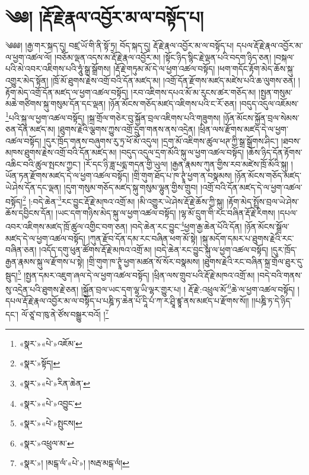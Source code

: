 \chapter{༄༅། །རྡོ་རྗེ་རྣལ་འབྱོར་མ་ལ་བསྟོད་པ།}༄༅༅། །རྒྱ་གར་སྐད་དུ། བཛྲ་ཡོ་གི་ནི་སྟོ་ཏྲ། བོད་སྐད་དུ། རྡོ་རྗེ་རྣལ་འབྱོར་མ་ལ་བསྟོད་པ། དཔལ་རྡོ་རྗེ་རྣལ་འབྱོར་མ་ལ་ཕྱག་འཚལ་ལོ། །བཅོམ་ལྡན་འདས་མ་རྡོ་རྗེ་རྣལ་འབྱོར་མ། །སྟོང་ཉིད་སྙིང་རྗེ་ལྡན་པའི་བདག་ཉིད་ཅན། །བསྐལ་པའི་མེ་འབར་འཇིགས་པའི་ཧཱུཾ་སྒྲ་སྒྲོགས། །རྡོ་རྗེ་གཏུམ་མོ་དེ་ལ་ཕྱག་འཚལ་བསྟོད། །ཕག་གདོང་རྟོག་མེད་ཆོས་སྐུ་འགྱུར་མེད་སྟོན། །ཁྲོ་མོ་ཐུགས་རྗེས་འགྲོ་བའི་དོན་མཛད་མ། །འགྲོ་དོན་རྫོགས་མཛད་མཛེས་པའི་ཆ་ལུགས་ཅན། །རྟོག་མེད་འགྲོ་དོན་མཛད་ལ་ཕྱག་འཚལ་བསྟོད། །རབ་འཇིགས་དཔའ་མོ་མ་རུངས་ཚར་གཅོད་མ། །སྤྱན་གསུམ་མཆེ་གཙིགས་སྐུ་གསུམ་དོན་དང་ལྡན། །ཉོན་མོངས་གཅོད་མཛད་འཇིགས་པའི་ང་རོ་ཅན། །བདུད་འདུལ་འཇོམས་\footnote{«སྣར་»«པེ་»འཇོམ་}པའི་སྐུ་ལ་ཕྱག་འཚལ་བསྟོད། །སྐྲ་གྲོལ་གཅེར་བུ་སྐྱོན་བྲལ་འཇིགས་པའི་གཟུགས། །ཉོན་མོངས་སྐྱོན་བྲལ་སེམས་ཅན་དོན་མཛད་མ། །ཐུགས་རྗེའི་ལྕགས་ཀྱུས་འགྲོ་དྲུག་གནས་ནས་འདྲེན། །ཕྲིན་ལས་རྫོགས་མཛད་དེ་ལ་ཕྱག་འཚལ་བསྟོད། །དུར་ཁྲོད་གནས་བཞུགས་རུ་ཏྲ་ཕོ་མོ་འདུལ། །དྲག་མོ་འཇིགས་ཚུལ་ཕཊ་ཀྱི་སྒྲ་སྒྲོགས་ཤིང་། །ཐབས་མཁས་ཐུགས་རྗེས་འགྲོ་བའི་དོན་མཛད་མ། །བདུད་འདུལ་དྲག་མོའི་སྐུ་ལ་ཕྱག་འཚལ་བསྟོད། །ཆོས་ཉིད་དོན་རྟོགས་འཆིང་བའི་ཚུལ་སྤངས་ཀྱང་། །རོ་དང་ཉི་ཟླ་པདྨ་གདན་གྱི་ཡུལ། །རྒྱན་རྣམས་ཀུན་གྱིས་རབ་མཛེས་ཁྲོ་མོའི་སྐུ། །ཡོན་ཏན་རྫོགས་མཛད་དེ་ལ་ཕྱག་འཚལ་བསྟོད། །གྲི་གུག་ཐོད་པ་ཁ་ཊྭཱཾ་ཕྱག་ན་བསྣམས། །ཉོན་མོངས་གཅོད་མཛད་ཡེ་ཤེས་དོན་དང་ལྡན། །དུག་གསུམ་གཅོད་མཛད་སྐུ་གསུམ་ལྷུན་གྱིས་གྲུབ། །འགྲོ་བའི་དོན་མཛད་དེ་ལ་ཕྱག་འཚལ་བསྟོད།\footnote{«སྣར་»སྟོད།} །:བདེ་ཆེན་\footnote{«སྣར་»«པེ་»རིན་ཆེན་}རང་བྱུང་རྡོ་རྗེ་མཁའ་འགྲོ་མ། །མི་འགྱུར་ཡེ་ཤེས་རྡོ་རྗེ་ཆོས་ཀྱི་སྐུ། །རྟོག་མེད་སྤྲོས་བྲལ་ཡེ་ཤེས་ཆོས་དབྱིངས་དོན། །ཡང་དག་གཉིས་མེད་སྐུ་ལ་ཕྱག་འཚལ་བསྟོད། །ལྷ་མོ་དྲུག་གི་རང་བཞིན་རྡོ་རྗེ་རིགས། །དཔལ་འབར་འཇིགས་མཛད་ཁྲོ་ཚུལ་འགྱིང་བག་ཅན། །བདེ་ཆེན་རང་བྱུང་\footnote{«སྣར་»«པེ་»འབྱུང་}ཕྱག་རྒྱ་ཆེན་པོའི་དོན། །ཉོན་མོངས་སྒྲོལ་མཛད་དེ་ལ་ཕྱག་འཚལ་བསྟོད། །ཀུན་རྫོབ་དོན་དམ་རང་བཞིན་ཕག་མོ་སྟེ། །སྐུ་མདོག་དམར་པ་ཐུགས་རྗེའི་རང་བཞིན་ཅན། །འདོད་དགུ་ཕུན་ཚོགས་རྡོ་རྗེ་མཁའ་འགྲོ་མ། །བདེ་ཆེན་རང་བྱུང་སྐུ་ལ་ཕྱག་འཚལ་བསྟོད། །དུར་ཁྲོད་རྒྱན་རྣམས་སྐུ་ལ་རྫོགས་པ་སྟེ། །གྲི་གུག་ཁ་ཊྭཱཾ་ཕྱག་མཚན་སོ་སོར་བསྣམས། །ཐུགས་རྗེའི་རང་བཞིན་སྐྲ་གྲོལ་ཐུར་དུ་སྦུད།\footnote{«སྣར་»«པེ་»སྤུངས།} །སྤྱན་དམར་འཇུག་ཞལ་དེ་ལ་ཕྱག་འཚལ་བསྟོད། །ཕྲིན་ལས་གྲུབ་པའི་རྡོ་རྗེ་མཁའ་འགྲོ་མ། །བདེ་བའི་གནས་སུ་འདྲེན་པའི་ཐུགས་རྗེ་ཅན། །སྐྱོན་བྲལ་ཡང་དག་ལྷ་ཡི་ལྷར་གྱུར་པ། །
རྡོ་རྗེ་:འཕྲུལ་མོ་\footnote{«སྣར་»འཕྲུལ་མ་}ཆེ་ལ་ཕྱག་འཚལ་བསྟོད། །དཔལ་རྡོ་རྗེ་རྣལ་འབྱོར་མ་ལ་བསྟོད་པ་པཎྜི་ཏ་ཆེན་པོ་དཱི་པཾ་ཀ་ར་ཤྲཱི་ཛྙཱ་ནས་མཛད་པ་རྫོགས་སོ།། །།པཎྜི་ཏ་དེ་ཉིད་དང་། ལོ་ཙཱ་བ་ཁུ་ནེ་ཙོས་བསྒྱུར་བའོ། །\footnote{«སྣར་»། །མངྒ་ལཾ་«པེ་»། །སརྦ་མངྒ་ལཾ།}